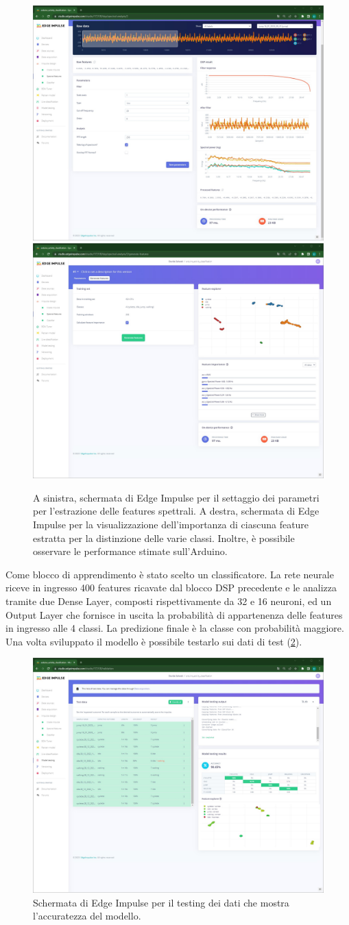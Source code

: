 \begin{figure}[t!]
	\centering
	\includegraphics[width=0.49\linewidth]{./ImageFiles/spectral_features.jpg}
	\includegraphics[width=0.49\linewidth]{./ImageFiles/features_extracted.jpg}
	\caption{A sinistra, schermata di Edge Impulse per il settaggio dei parametri per l'estrazione delle features spettrali. A destra, schermata di Edge Impulse per la visualizzazione dell'importanza di ciascuna feature estratta per la distinzione delle varie classi. Inoltre, è possibile osservare le performance stimate sull'Arduino.}
	\label{fig:spectral_feature}
\end{figure}
Come blocco di apprendimento è stato scelto un classificatore. La rete neurale riceve in ingresso 400 features ricavate dal blocco DSP precedente e le analizza tramite due Dense Layer, composti rispettivamente da 32 e 16 neuroni, ed un Output Layer che fornisce in uscita la probabilità di appartenenza delle features in ingresso alle 4 classi. La predizione finale è la classe con probabilità maggiore.
Una volta sviluppato il modello è possibile testarlo sui dati di test (\Fig\ref{fig:model_test}).

\begin{figure}[h!]
	\centering
	\includegraphics[width=0.5\linewidth]{./ImageFiles/model_test.jpg}
	\caption{Schermata di Edge Impulse per il testing dei dati che mostra l'accuratezza del modello.}
	\label{fig:model_test}
\end{figure}

